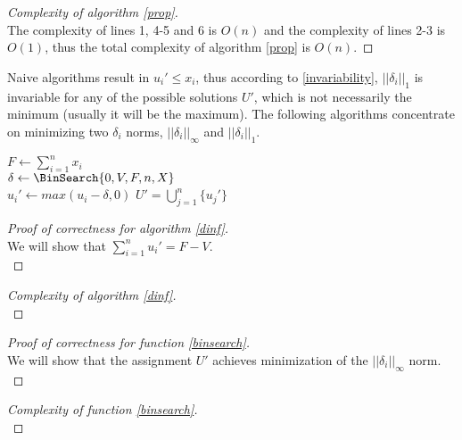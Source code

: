 \documentclass[11pt]{article}
\theoremstyle{definition}
\theoremstyle{corollary}
\begin{document}
    \begin{proof}[Complexity of algorithm \ref{prop}] \ \\
       The complexity of lines 1, 4-5 and 6 is $O(n)$ and the complexity of lines 2-3 is $O(1)$, thus the total complexity
       of algorithm \ref{prop} is $O(n)$.
    \end{proof}
    Naive algorithms result in $u_i' \leq x_i$, thus according to \ref{invariability}, $||\delta_i||_1$ is invariable for
    any of the possible solutions $U'$, which is not necessarily the minimum (usually it will be the maximum). The following
    algorithms concentrate on minimizing two $\delta_i$ norms, $||\delta_i||_\infty$ and $||\delta_i||_1$. \\
    \begin{algorithm}[H]
       \label{dinf}
       \caption{$||\delta_i||_\infty$ minimizer}
       $F \gets \sum\limits_{i=1}^{n}x_i$ \\
       $\delta \gets \BinSearch{0,V,F,n,X}$ \\
          {$u_i' \gets max(u_i - \delta, 0)$}
       \Return $U' = \bigcup\limits_{j=1}^{n}\{u_j'\}$
    \end{algorithm}
    \begin{proof}[Proof of correctness for algorithm \ref{dinf}] \ \\
       We will show that $\sum\limits_{i=1}^{n}u_i' = F - V$. \\
    \end{proof}
    \begin{proof}[Complexity of algorithm \ref{dinf}] \ \\
    \end{proof}

    \begin{algorithm}[H]
       \label{binsearch}
       \Output{$\delta$}
       \caption*{\textbf{function} \texttt{BinSearch} }
    \end{algorithm}
    \begin{proof}[Proof of correctness for function \ref{binsearch}] \ \\
       We will show that the assignment $U'$ achieves minimization of the $||\delta_i||_\infty$ norm. \\
    \end{proof}
    \begin{proof}[Complexity of function \ref{binsearch}] \ \\
    \end{proof}
    
\end{document}
